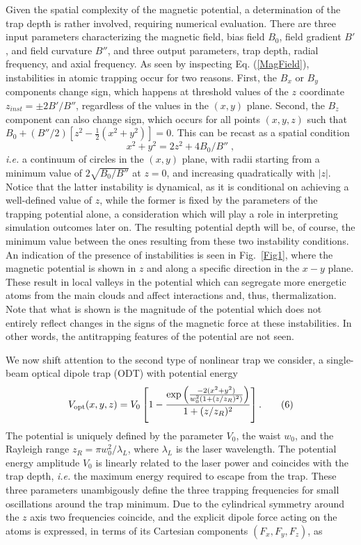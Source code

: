\documentclass[pra,letterpaper,onecolumn,superscriptaddress,floatfix]{revtex4}
\begin{document}
Given the spatial complexity of the magnetic potential, a determination of the trap depth is rather involved, 
requiring numerical evaluation. There are three input parameters characterizing the magnetic field, 
bias field $B_0$, field gradient $B'$, and field curvature $B''$, and three output parameters, trap depth, 
radial frequency, and axial frequency. As seen by inspecting Eq. (\ref{MagField}), instabilities 
in atomic trapping occur for two reasons. First, the $B_x$ or $B_y$ components change sign, which happens 
at threshold values of the $z$ coordinate $z_{inst}=\pm 2 B'/B''$, regardless of the values in the $(x,y)$ plane. 
Second, the $B_z$ component can also change sign, which occurs for all points $(x,y,z)$ such that 
$B_0+(B''/2) [z^2-\frac{1}{2}(x^2+y^2)]=0$. This can be recast as a spatial condition 
\begin{equation}
x^2+y^2=2 z^2 +4 B_0/B'' \;,
\tag{5}
\label{StabilityMT}
\end{equation}
{\it i.e.} a continuum of circles in the $(x,y)$ plane, with radii starting from 
a minimum value of $2 \sqrt{B_0/B''}$ at $z=0$, and increasing quadratically with $|z|$.
Notice that the latter instability is dynamical, as it is conditional on achieving a well-defined value of 
$z$, while the former is fixed by the parameters of the trapping potential alone, a consideration which will 
play a role in interpreting simulation outcomes later on. The resulting potential depth will be, of course, 
the minimum value between the ones resulting from these two instability conditions. An indication of the presence 
of instabilities is seen in Fig.~\ref{Fig1}, where the magnetic potential is shown in $z$ and along a specific direction 
in the $x-y$ plane. These result in local valleys in the potential which can segregate
more energetic atoms from the main clouds and affect interactions and, thus, thermalization. Note that
what is shown is the magnitude of the potential which does not entirely reflect changes in the signs of the 
magnetic force at these instabilities. In other words, the antitrapping features of the potential are not seen.   

We now shift attention to the second type of nonlinear trap we consider, a single-beam optical dipole trap (ODT) 
with potential energy
\begin{equation}
V_{\rm opt}(x,y,z)=V_0 \left[1-\frac{\exp\left(\frac{-2(x^2+y^2)}{w_0^2(1+(z/z_R)^2)}\right)}
{1+(z/z_R)^2} \right].
\tag{6}
\end{equation}
The potential is uniquely defined by the parameter $V_0$, the waist $w_0$, and the Rayleigh range 
$z_R=\pi w_0^2/\lambda_L$, where $\lambda_L$ is the laser wavelength. The potential energy amplitude $V_0$ 
is linearly related to the laser power and coincides with the trap depth, {\it i.e.} the maximum energy 
required to escape from the trap. These three parameters unambigously define the three 
trapping frequencies for small oscillations around the trap minimum. 
Due to the cylindrical symmetry around the $z$ axis two frequencies coincide, and the explicit dipole 
force acting on the atoms is expressed, in terms of its Cartesian components $(F_x, F_y, F_z)$, as
\end{document}
